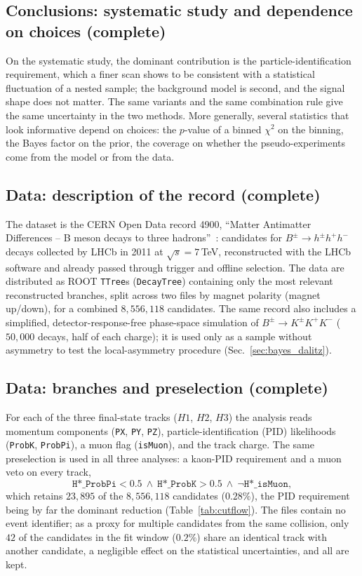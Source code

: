 \subsection{Conclusions: systematic study and dependence on choices (complete)}
On the systematic study, the dominant contribution is the particle-identification requirement, which a finer scan shows to be consistent with a statistical fluctuation of a nested sample; the background model is second, and the signal shape does not matter. The same variants and the same combination rule give the same uncertainty in the two methods. More generally, several statistics that look informative depend on choices: the $p$-value of a binned $\chi^2$ on the binning, the Bayes factor on the prior, the coverage on whether the pseudo-experiments come from the model or from the data.

\subsection{Data: description of the record (complete)}
The dataset is the CERN Open Data record 4900, ``Matter Antimatter Differences -- B meson decays to three hadrons''~\cite{opendata_record}: candidates for $B^{\pm}\to h^{\pm}h^{+}h^{-}$ decays collected by LHCb in 2011 at $\sqrt{s}=7$\,TeV, reconstructed with the LHCb software and already passed through trigger and offline selection. The data are distributed as ROOT \texttt{TTree}s (\texttt{DecayTree}) containing only the most relevant reconstructed branches, split across two files by magnet polarity (magnet up/down), for a combined $8{,}556{,}118$ candidates. The same record also includes a simplified, detector-response-free phase-space simulation of $B^{\pm}\to K^{\pm}K^{+}K^{-}$ ($50{,}000$ decays, half of each charge); it is used only as a sample without asymmetry to test the local-asymmetry procedure (Sec.~\ref{sec:bayes_dalitz}).

\subsection{Data: branches and preselection (complete)}
For each of the three final-state tracks ($H1$, $H2$, $H3$) the analysis reads momentum components (\texttt{PX}, \texttt{PY}, \texttt{PZ}), particle-identification (PID) likelihoods (\texttt{ProbK}, \texttt{ProbPi}), a muon flag (\texttt{isMuon}), and the track charge. The same preselection is used in all three analyses: a kaon-PID requirement and a muon veto on every track,
\[
\texttt{H*\_ProbPi} < 0.5 \ \wedge\ \texttt{H*\_ProbK} > 0.5 \ \wedge\ \lnot\texttt{H*\_isMuon},
\]
which retains $23{,}895$ of the $8{,}556{,}118$ candidates ($0.28\%$), the PID requirement being by far the dominant reduction (Table~\ref{tab:cutflow}). The files contain no event identifier; as a proxy for multiple candidates from the same collision, only $42$ of the candidates in the fit window ($0.2\%$) share an identical track with another candidate, a negligible effect on the statistical uncertainties, and all are kept.

